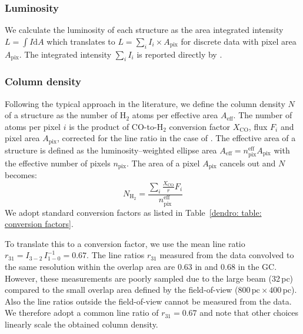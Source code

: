 \subsubsection{Luminosity}
\label{dendro: section: luminosity}
We calculate the luminosity of each structure as the area integrated intensity $L = \int I \mathrm{d}A$ which translates to $L = \sum_i I_i \times A_\mathrm{pix}$ for discrete data with pixel area $A_\mathrm{pix}$. The integrated intensity $\sum_i I_i$ is reported directly by \astrodendro.


\subsubsection{Column density}
\label{dendro: section: dendrogram column density}

Following the typical approach in the literature, we define the column density $N$ of a structure as the number of H$_2$ atoms per effective area $A_\mathrm{eff}$.
The number of atoms per pixel $i$ is the product of CO-to-H$_2$ conversion factor $X_\mathrm{CO}$, flux $F_i$ and pixel area $A_\mathrm{pix}$, corrected for the line ratio in the case of .
The effective area of a structure is defined as the luminosity--weighted ellipse area $A_\mathrm{eff} = n_\mathrm{pix}^\mathrm{eff} A_\mathrm{pix}$ with the effective number of pixels $n_\mathrm{pix}$. 
The area of a pixel $A_\mathrm{pix}$ cancels out and $N$ becomes:
\begin{equation}
    N_\mathrm{H_2} = \frac{\sum_i \frac{X_\mathrm{CO}}{r} F_i}{n_\mathrm{pix}^\mathrm{eff}}
    \label{equation: column density}
\end{equation}
We adopt standard  conversion factors as listed in Table~\ref{dendro: table: conversion factors}.

To translate this to a  conversion factor, we use the mean line ratio $r_{31} = I_{3-2}\,I_{1-0} ^{-1} = 0.67$.
The line ratios $r_{31}$ measured from the data convolved to the same resolution within the overlap area are $0.63$ in  and $0.68$ in the GC. However, these measurements are poorly sampled due to the large  beam (32\,pc) compared to the small overlap area defined by the  field-of-view ($800\,\mathrm{pc} \times 400$\,pc). Also the line ratios outside the  field-of-view cannot be measured from the data.
We therefore adopt a common line ratio of $r_{31}=0.67$ and note that other choices linearly scale the obtained column density.


